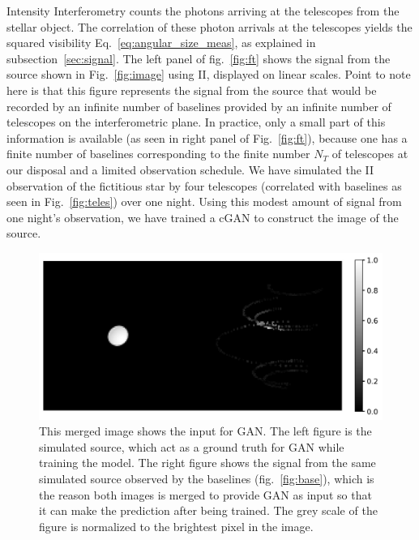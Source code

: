 Intensity Interferometry counts the photons arriving at the telescopes from the stellar object. The correlation of these photon arrivals at the telescopes yields the squared visibility Eq.~\eqref{eq:angular_size_meas}, as explained in subsection~\ref{sec:signal}. The left panel of fig.~\ref{fig:ft} shows the signal from the source shown in Fig.~\ref{fig:image} using II, displayed on linear scales. Point to note here is that this figure represents the signal from the source that would be recorded by an infinite number of baselines provided by an infinite number of telescopes on the interferometric plane. In practice, only a small part of this information is available (as seen in right panel of Fig.~\ref{fig:ft}), because one has a finite number of baselines corresponding to the finite number $N_T$ of telescopes at our disposal and a limited observation schedule. We have simulated the II observation of the fictitious star by four telescopes (correlated with baselines as seen in Fig.~\ref{fig:teles}) over one night. Using this modest amount of signal from one night's observation, we have trained a cGAN to construct the image of the source.
\begin{figure}
   \centering
  \includegraphics[width=0.85\linewidth]{fig/ellipse1612.jpg}
  \caption{This merged image shows the input for GAN. The left figure is the simulated source, which act as a ground truth for GAN while training the model. The right figure shows the signal from the same simulated source observed by the baselines (fig.~\ref{fig:base}), which is the reason both images is merged to provide GAN as input so that it can make the prediction after being trained. The grey scale of the figure is normalized to the brightest pixel in the image.}
  \label{fig:GANinput}
\end{figure}
